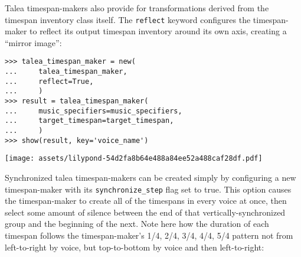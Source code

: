 \noindent Talea timespan-makers also provide for transformations derived from
the timespan inventory class itself. The \texttt{reflect} keyword configures
the timespan-maker to reflect its output timespan inventory around its own
axis, creating a \enquote{mirror image}:

\begin{comment}
<abjad>
talea_timespan_maker = new(
    talea_timespan_maker,
    reflect=True,
    )
result = talea_timespan_maker(
    music_specifiers=music_specifiers,
    target_timespan=target_timespan,
    )
show(result, key='voice_name')
</abjad>
\end{comment}

\begin{singlespacing}
\vspace{-0.5\baselineskip}
\begin{lstlisting}
>>> talea_timespan_maker = new(
...     talea_timespan_maker,
...     reflect=True,
...     )
>>> result = talea_timespan_maker(
...     music_specifiers=music_specifiers,
...     target_timespan=target_timespan,
...     )
>>> show(result, key='voice_name')
\end{lstlisting}
\noindent\texttt{[image: assets/lilypond-54d2fa8b64e488a84ee52a488caf28df.pdf]}
\end{singlespacing}

\noindent Synchronized talea timespan-makers can be created simply by
configuring a new timespan-maker with its \texttt{synchronize\_step} flag set
to true. This option causes the timespan-maker to create all of the timespans
in every voice at once, then select some amount of silence between the end of
that vertically-synchronized group and the beginning of the next. Note here how
the duration of each timespan follows the timespan-maker's 1/4, 2/4, 3/4, 4/4,
5/4 pattern not from left-to-right by voice, but top-to-bottom by voice and
then left-to-right:

\begin{comment}
<abjad>
synchronized_talea_timespan_maker = consort.TaleaTimespanMaker(
    playing_talea=rhythmmakertools.Talea(
        counts=(1, 2, 3, 4, 5),
        denominator=8,
        ),
    silence_talea=rhythmmakertools.Talea(
        counts=(4, 7),
        denominator=8,
        ),
    synchronize_step=True,
    )
result = synchronized_talea_timespan_maker(
    music_specifiers=music_specifiers,
    target_timespan=target_timespan,
    )
show(result, key='voice_name')
</abjad>
\end{comment}


